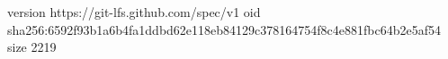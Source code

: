 version https://git-lfs.github.com/spec/v1
oid sha256:6592f93b1a6b4fa1ddbd62e118eb84129c378164754f8c4e881fbc64b2e5af54
size 2219
